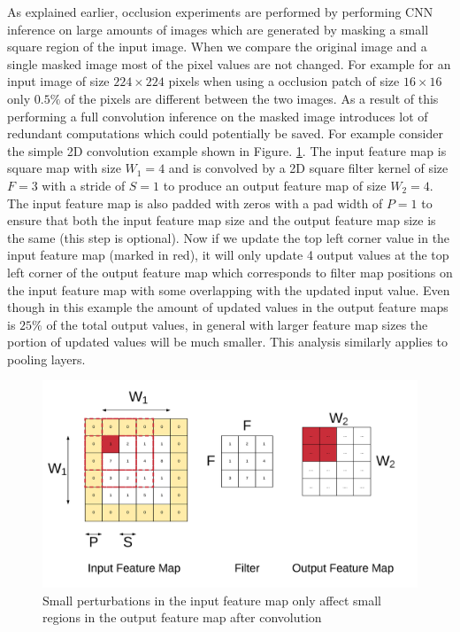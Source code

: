 \documentclass[10, sigconf]{acmart}
\begin{document}
As explained earlier, occlusion experiments are performed by performing CNN inference on large amounts of images which are generated by masking a small square region of the input image.
When we compare the original image and a single masked image most of the pixel values are not changed. For example for an input image of size $224\times224$ pixels when using a occlusion patch of size $16\times16$ only $0.5\%$ of the pixels are different between the two images.
As a result of this performing a full convolution inference on the masked image introduces lot of redundant computations which could potentially be saved.
For example consider the simple 2D convolution example shown in Figure. \ref{fig:perturbation}.
The input feature map is square map with size $W_1=4$ and is convolved by a 2D square filter kernel of size $F=3$ with a stride of $S=1$ to produce an output feature map of size $W_2=4$.
The input feature map is also padded with zeros with a pad width of $P=1$ to ensure that both the input feature map size and the output feature map size is the same (this step is optional).
Now if we update the top left corner value in the input feature map (marked in red), it will only update 4 output values at the top left corner of the output feature map which corresponds to filter map positions on the input feature map with some overlapping with the updated input value.
Even though in this example the amount of updated values in the output feature maps is $25\%$ of the total output values, in general with larger feature map sizes the portion of updated values will be much smaller.
This analysis similarly applies to pooling layers.

\begin{figure}
  \includegraphics[width=\columnwidth]{./images/small_perturbations}
  \caption{Small perturbations in the input feature map only affect small regions in the output feature map after convolution}
  \label{fig:perturbation}
\end{figure}
\end{document}
